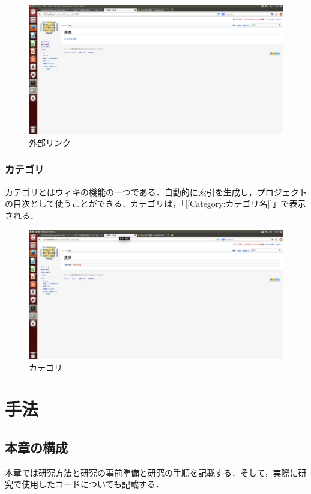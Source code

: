\begin{figure}[htb]
\centering
\includegraphics[width=14cm]{gaibu}
\caption{外部リンク}\label{図}
\end{figure}


\subsection{カテゴリ}
カテゴリとはウィキの機能の一つである．自動的に索引を生成し，プロジェクトの目次として使うことができる．カテゴリは，「[[Category:カテゴリ名]]」で表示される．




\begin{figure}[htb]
\centering
\includegraphics[width=14cm]{kategori}
\caption{カテゴリ}\label{図}
\end{figure}







\chapter{手法}
\section{本章の構成}
本章では研究方法と研究の事前準備と研究の手順を記載する．そして，実際に研究で使用したコードについても記載する．
